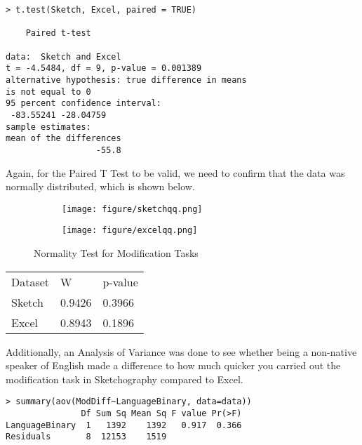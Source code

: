 \begin{verbatim}
> t.test(Sketch, Excel, paired = TRUE)

	Paired t-test

data:  Sketch and Excel
t = -4.5484, df = 9, p-value = 0.001389
alternative hypothesis: true difference in means 
is not equal to 0
95 percent confidence interval:
 -83.55241 -28.04759
sample estimates:
mean of the differences 
                  -55.8 
\end{verbatim}

Again, for the Paired T Test to be valid, we need to confirm that the data was normally distributed, which is shown below.
\begin{figure}[H]
		\centering
		\begin{subfigure}[b]{\textwidth}
			\texttt{[image: figure/sketchqq.png]}
		\end{subfigure}
		\begin{subfigure}[b]{\textwidth}
			\texttt{[image: figure/excelqq.png]}
		\end{subfigure}
		\caption{Normality Test for Modification Tasks}
	\end{figure}


\begin{tabular}{l l l}
Dataset & W & p-value \\
Sketch & 0.9426 & 0.3966 \\
Excel & 0.8943 & 0.1896 \\
\end{tabular}

Additionally, an Analysis of Variance was done to see whether being a non-native speaker of English made a difference to how much quicker you carried out the modification task in Sketchography compared to Excel.
\begin{verbatim}
> summary(aov(ModDiff~LanguageBinary, data=data))
               Df Sum Sq Mean Sq F value Pr(>F)
LanguageBinary  1   1392    1392   0.917  0.366
Residuals       8  12153    1519    
\end{verbatim}